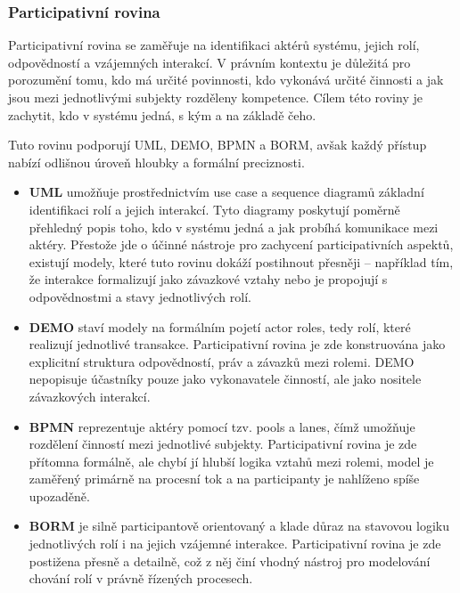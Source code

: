 
\subsubsection{Participativní rovina}
\label{sec:participativni-rovina}

Participativní rovina se zaměřuje na identifikaci aktérů systému, jejich rolí, odpovědností a vzájemných interakcí. V právním kontextu je důležitá pro porozumění tomu, kdo má určité povinnosti, kdo vykonává určité činnosti a jak jsou mezi jednotlivými subjekty rozděleny kompetence. Cílem této roviny je zachytit, kdo v systému jedná, s kým a na základě čeho.

Tuto rovinu podporují UML, DEMO, BPMN a BORM, avšak každý přístup nabízí odlišnou úroveň hloubky a formální preciznosti.

\begin{itemize}
  \item \textbf{UML} umožňuje prostřednictvím use case a sequence diagramů základní identifikaci rolí a jejich interakcí. Tyto diagramy poskytují poměrně přehledný popis toho, kdo v systému jedná a jak probíhá komunikace mezi aktéry. Přestože jde o účinné nástroje pro zachycení participativních aspektů, existují modely, které tuto rovinu dokáží postihnout přesněji – například tím, že interakce formalizují jako závazkové vztahy nebo je propojují s odpovědnostmi a stavy jednotlivých rolí.

  \item \textbf{DEMO} staví modely na formálním pojetí actor roles, tedy rolí, které realizují jednotlivé transakce. Participativní rovina je zde konstruována jako explicitní struktura odpovědností, práv a závazků mezi rolemi. DEMO nepopisuje účastníky pouze jako vykonavatele činností, ale jako nositele závazkových interakcí.

  \item \textbf{BPMN} reprezentuje aktéry pomocí tzv. pools a lanes, čímž umožňuje rozdělení činností mezi jednotlivé subjekty. Participativní rovina je zde přítomna formálně, ale chybí jí hlubší logika vztahů mezi rolemi, model je zaměřený primárně na procesní tok a na participanty je nahlíženo spíše upozaděně.

  \item \textbf{BORM} je silně participantově orientovaný a klade důraz na stavovou logiku jednotlivých rolí i na jejich vzájemné interakce. Participativní rovina je zde postižena přesně a detailně, což z něj činí vhodný nástroj pro modelování chování rolí v právně řízených procesech.

\end{itemize}


